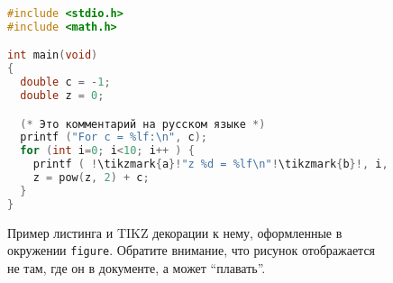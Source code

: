 \begin{figure}
\begin{lstlisting}[escapechar=!, basicstyle=\ttfamily, language=c, keepspaces=true]
#include <stdio.h>
#include <math.h>

int main(void)
{
  double c = -1;
  double z = 0;

  (* Это комментарий на русском языке *)
  printf ("For c = %lf:\n", c);
  for (int i=0; i<10; i++ ) {
    printf ( !\tikzmark{a}!"z %d = %lf\n"!\tikzmark{b}!, i, z);
    z = pow(z, 2) + c;
  }
}
\end{lstlisting}

\caption{Пример листинга и \textsc{TIKZ} декорации к нему, оформленные в окружении \texttt{figure}. Обратите внимание, что рисунок отображается не там, где он в документе, а может \enquote{плавать}.}
\end{figure}
